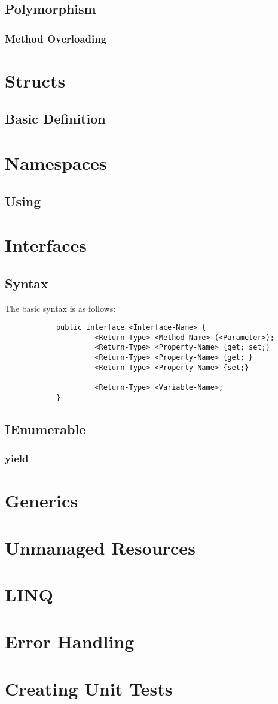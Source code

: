 \documentclass {amsart}
\begin{document}
	\subsection{Polymorphism}
		\subsubsection{Method Overloading}
\section{Structs}
	\subsection{Basic Definition}
	

\section{Namespaces}
	\subsection {Using}
\section{Interfaces}
	\subsection{Syntax} The basic syntax is as follows: 
		\begin{verbatim}
			public interface <Interface-Name> {
				     <Return-Type> <Method-Name> (<Parameter>);
				     <Return-Type> <Property-Name> {get; set;}
				     <Return-Type> <Property-Name> {get; }
				     <Return-Type> <Property-Name> {set;}

				     <Return-Type> <Variable-Name>;
			}
		\end{verbatim}
	\subsection{IEnumerable}
		\subsubsection {yield}


\section{Generics}

\section{Unmanaged Resources}

\section{LINQ}

\section{Error Handling}

\section{Creating Unit Tests}
\end{document}
